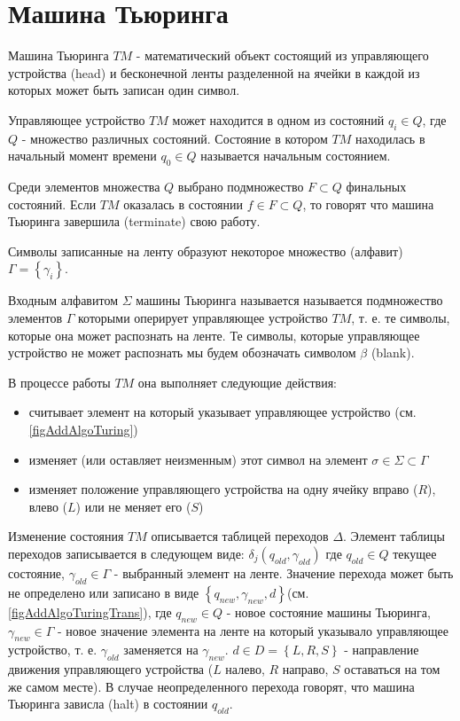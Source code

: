 \section{Машина Тьюринга}
\label{addTuring}

Машина Тьюринга $TM$ - математический объект состоящий из
управляющего устройства (head) и бесконечной ленты разделенной на
ячейки в каждой из которых может быть записан один символ.



Управляющее устройство $TM$ может находится в одном из состояний $q_i
\in Q$, где $Q$ 
- множество различных состояний. Состояние в котором $TM$ находилась в
начальный момент времени $q_0 \in Q$ называется начальным состоянием. 

Среди элементов множества $Q$ выбрано подмножество $F \subset Q$
финальных состояний. Если $TM$ оказалась в состоянии $f \in F \subset
Q$, то говорят что машина Тьюринга завершила (terminate) свою работу.

Символы записанные на ленту образуют некоторое множество (алфавит)
$\Gamma = \left\{\gamma_i\right\}$.

Входным алфавитом $\Sigma$ машины Тьюринга называется называется
подмножество элементов $\Gamma$ которыми оперирует управляющее устройство $TM$,
т. е. те символы, которые она может распознать на ленте. Те символы,
которые управляющее устройство не может распознать мы будем обозначать символом
$\beta$ (blank).

В процессе работы $TM$ она выполняет следующие действия:
\begin{itemize}
\item{считывает элемент на который указывает управляющее устройство
  (см. \autoref{figAddAlgoTuring})}
\item{изменяет (или оставляет неизменным) этот символ на элемент
  $\sigma \in \Sigma \subset \Gamma$}
\item{изменяет положение управляющего устройства на одну ячейку вправо
  ($R$), влево ($L$) или не меняет его ($S$)}
\end{itemize}



Изменение состояния $TM$ описывается таблицей переходов
$\Delta$. Элемент таблицы переходов записывается в следующем виде: 
$\delta_j\left(q_{old}, \gamma_{old}\right)$ где $q_{old} \in Q$ текущее состояние,
$\gamma_{old} \in \Gamma$ - выбранный элемент на ленте. Значение
перехода может быть 
не определено или записано в виде $\left\{q_{new}, \gamma_{new},
d\right\}$(см. \autoref{figAddAlgoTuringTrans}), где
$q_{new} \in Q$ - новое состояние машины Тьюринга, $\gamma_{new} \in \Gamma$ -
новое значение элемента на ленте на который указывало управляющее устройство,
т. е. $\gamma_{old}$ заменяется на $\gamma_{new}$. $d \in D =
\left\{L, R, S\right\}$ - направление
движения управляющего устройства ($L$ налево, $R$ направо, $S$
оставаться на том же самом месте). В случае неопределенного
перехода говорят, что машина Тьюринга зависла (halt) в состоянии $q_{old}$.

